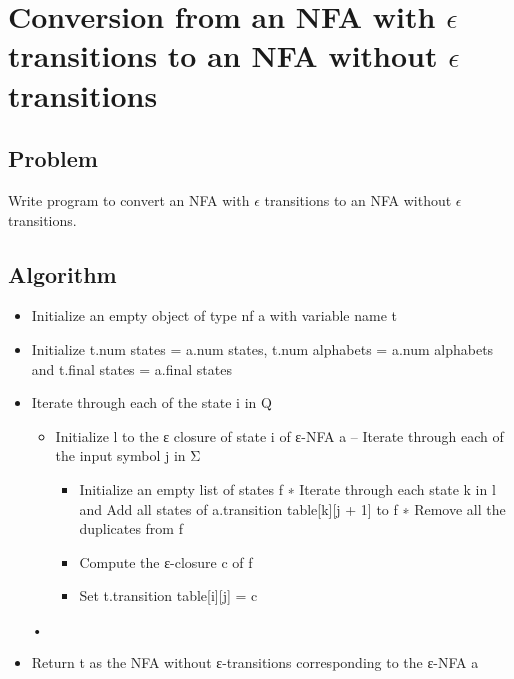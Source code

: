 \documentclass[a4paper, 12pt]{report}
\begin{document}
    \section{Conversion from an NFA with $\epsilon$ transitions to an NFA 
    without $\epsilon$ transitions}
    
    \subsection{Problem}
    Write program to convert an NFA with $\epsilon$ transitions to an NFA 
    without $\epsilon$ transitions.
    \subsection{Algorithm}
    \begin{itemize}
        \item{Initialize an empty object of type nf a with variable name t}
        \item{Initialize t.num states = a.num states, t.num alphabets = a.num alphabets
and t.final states = a.final states}
        \item{Iterate through each of the state i in Q
        \begin{itemize}
            \item {Initialize l to the ε closure of state i of ε-NFA a – Iterate through each of the input symbol j in Σ}
                \begin{itemize}
                    \item {Initialize an empty list of states f ∗ Iterate through each state k in l and Add all states of a.transition table[k][j + 1] to f ∗ Remove all the duplicates from f}
                    \item {Compute the ε-closure c of f}
                    \item {Set t.transition table[i][j] = c}
                \end{itemize}
        \end{itemize}}
• \item{Return t as the NFA without ε-transitions corresponding to the ε-NFA a}
    \end{itemize}
\end{document}
